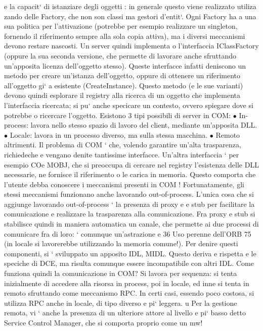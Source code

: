 \documentclass[a4paper,12pt]{article}
\begin{document}
e
la capacit` di istanziare degli oggetti : in generale questo viene realizzato utiliza
zando delle Factory, che non son classi ma gestori d'entit`. Ogni Factory ha
a
una sua politica per l'attivazione (potrebbe per esempio realizzare un singleton,
fornendo il riferimento sempre alla sola copia attiva), ma i diversi meccanismi
devono restare nascosti.
Un server quindi implementa o l'interfaccia IClassFactory (oppure la sua
seconda versione, che permette di lavorare anche sfruttando un'apposita licenza dell'oggetto stesso). Queste interfacce
infatti deniscono un metodo per
creare un'istanza dell'oggetto, oppure di ottenere un riferimento all'oggetto gi`
a
esistente (CreateInstance). Questo metodo (e le sue varianti) devono quindi
esplorare il registry alla ricerca di un oggetto che implementa l'interfaccia ricercata; si pu` anche specicare un
contesto, ovvero spiegare dove si potrebbe
o
ricercare l'oggetto.
Esistono 3 tipi possibili di server in COM:
$\bullet$ In-process: lavora nello stesso spazio di lavoro del client, mediante un'apposita DLL.
$\bullet$ Locale: lavora in un processo diverso, ma sulla stessa macchina.
$\bullet$ Remoto altrimenti.
Il problema di COM ` che, volendo garantire un'alta trasparenza, richiedeche
e
vengano denite tantissime interfacce. Un'altra interfaccia ` per esempio COe
MOBJ, che si preoccupa di cercare nel registry l'esistenza delle DLL necessarie,
ne fornisce il riferimento o le carica in memoria. Questo comporta che l'utente debba conoscere i meccanismi presenti in
COM ! Fortunatamente, gli stessi
meccanismi funzionano anche lavorando out-of-process.
L'unica cosa che si aggiunge lavorando out-of-process ` la presenza di proxy
e
e stub per facilitare la comunicazione e realizzare la trasparenza alla comunicazione. Fra proxy e stub si stabilisce
quindi in maniera automatica un canale,
che permette ai due processi di comunicare fra di loro: ` comunque un'astrazione
e
36 Uso
perenne dell'ORB
75
(in locale si lavorerebbe utilizzando la memoria comune!). Per denire questi
componenti, si ` sviluppato un apposito IDL, MIDL. Questo deriva e rispetta
e
le speciche di DCE, ma risulta comunque essere incompatibile con altri IDL.
Come funziona quindi la comunicazione in COM? Si lavora per sequenza: si
tenta inizialmente di accedere alla risorsa in process, poi in locale, ed inne si
tenta in remoto sfruttando come meccanismo RPC. In certi casi, essendo poco
costosa, si utilizza RPC anche in locale, di tipo diverso e pi` leggera.
u
Per la gestione remota, vi ` anche la presenza di un ulteriore attore al livello
e
pi` basso detto Service Control Manager, che si comporta proprio come un mw!
\end{document}
